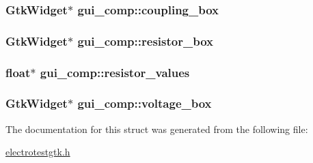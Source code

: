 \subsubsection[{\texorpdfstring{coupling\+\_\+box}{coupling_box}}]{\setlength{\rightskip}{0pt plus 5cm}Gtk\+Widget$\ast$ gui\+\_\+comp\+::coupling\+\_\+box}\hypertarget{structgui__comp_a7722645fb23d70f748dce48726312e48}{}\label{structgui__comp_a7722645fb23d70f748dce48726312e48}
\subsubsection[{\texorpdfstring{resistor\+\_\+box}{resistor_box}}]{\setlength{\rightskip}{0pt plus 5cm}Gtk\+Widget$\ast$ gui\+\_\+comp\+::resistor\+\_\+box}\hypertarget{structgui__comp_ac199204a02b549dbfaa6e3fbc83afde3}{}\label{structgui__comp_ac199204a02b549dbfaa6e3fbc83afde3}
\subsubsection[{\texorpdfstring{resistor\+\_\+values}{resistor_values}}]{\setlength{\rightskip}{0pt plus 5cm}float$\ast$ gui\+\_\+comp\+::resistor\+\_\+values}\hypertarget{structgui__comp_af1b4ad2cb926ff413cb2ae610f8c434d}{}\label{structgui__comp_af1b4ad2cb926ff413cb2ae610f8c434d}
\subsubsection[{\texorpdfstring{voltage\+\_\+box}{voltage_box}}]{\setlength{\rightskip}{0pt plus 5cm}Gtk\+Widget$\ast$ gui\+\_\+comp\+::voltage\+\_\+box}\hypertarget{structgui__comp_a3fd9c0f2b750bac7e5bb0ad46d0d2f68}{}\label{structgui__comp_a3fd9c0f2b750bac7e5bb0ad46d0d2f68}


The documentation for this struct was generated from the following file\+:\begin{DoxyCompactItemize}
\item 
\hyperlink{electrotestgtk_8h}{electrotestgtk.\+h}\end{DoxyCompactItemize}
